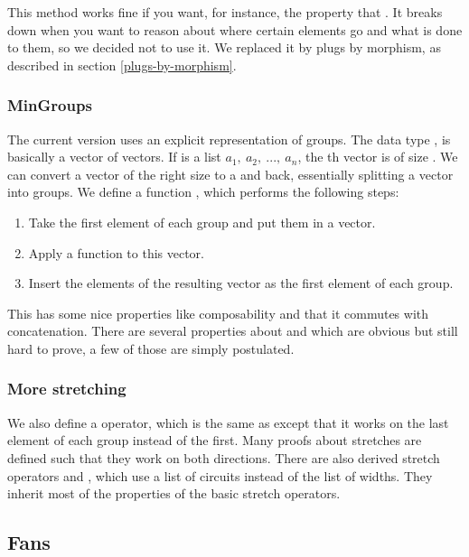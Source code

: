 This method works fine if you want, for instance, the property that
.
It breaks down when you want to reason about where certain elements go
and what is done to them, so we decided not to use it.
We replaced it by plugs by morphism, as described in section
\ref{plugs-by-morphism}.

\subsubsection{MinGroups}\label{mingroups}

The current version uses an explicit representation of groups.
The data type    , is basically a
vector of vectors.
If  is a list $a_1,\ a_2,\ ...,\ a_n$, the th vector is
of size  \AF{+} .
We can convert a vector of the right size to a  and
back, essentially splitting a vector into groups.
We define a function , which performs
the following steps:

\begin{enumerate}
\item Take the first element of each group and put them in a vector.
\item Apply a function to this vector.
\item Insert the elements of the resulting vector as the first element of
  each group.
\end{enumerate}

This  has some nice properties like composability and
that it commutes with concatenation.
There are several properties about  and 
which are obvious but still hard to prove, a few of those are simply
postulated.

\subsubsection{More stretching}\label{more-stretching}

We also define a  operator, which is the same as  except
that it works on the last element of each group instead of the first.
Many proofs about stretches are defined such that they work on both
directions.
There are also derived stretch operators  and , which use
a list of circuits instead of the list of widths.
They inherit most of the properties of the basic stretch operators.

\subsection{Fans}\label{fans}

